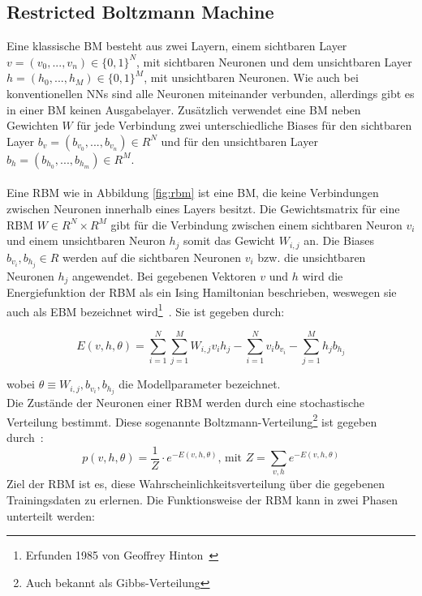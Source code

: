 \subsection{Restricted Boltzmann Machine}
\label{subsec:rbm}
Eine klassische BM besteht aus zwei Layern, einem sichtbaren Layer \\$v = (v_0, ... , v_n) \in \{0,1\}^N$, mit sichtbaren Neuronen und dem unsichtbaren Layer $h = (h_0, ... , h_M) \in \{0,1\}^M $, mit unsichtbaren Neuronen.
Wie auch bei konventionellen NNs sind alle Neuronen miteinander verbunden, allerdings gibt es in einer BM keinen Ausgabelayer. Zusätzlich verwendet eine BM neben Gewichten $W$ für jede Verbindung zwei unterschiedliche Biases für den sichtbaren Layer $b_{v} = (b_{v_0}, ... , b_{v_n}) \in R^N $ und für den unsichtbaren Layer $b_h = (b_{h_0}, ... , b_{h_m}) \in R^M $.\\\\ 
Eine RBM wie in Abbildung \ref{fig:rbm} ist eine BM, die keine Verbindungen zwischen Neuronen innerhalb eines Layers besitzt. Die Gewichtsmatrix für eine RBM $W \in R^N \times R^M$ gibt für die Verbindung zwischen einem sichtbaren Neuron $v_i$ und einem unsichtbaren Neuron $h_j$ somit das Gewicht $W_{i,j} $ an. Die Biases $b_{v_i}, b_{h_j} \in R$ werden auf die sichtbaren Neuronen $v_i$ bzw. die unsichtbaren Neuronen $h_j$ angewendet. Bei gegebenen Vektoren $v$ und $h$ wird die Energiefunktion der RBM als ein Ising Hamiltonian beschrieben, weswegen sie auch als EBM bezeichnet wird\footnote{Erfunden 1985 von Geoffrey Hinton~\cite{ackley1985learning}}~\cite{fischer2012introduction}. Sie ist gegeben durch:

\begin{equation} \label{eq:energiefunktion}
    E(v,h,\theta) = \sum^N_{i=1}\sum^M_{j=1} W_{i,j} v_i h_j - \sum^N_{i=1} v_i b_{v_i} - \sum^M_{j=1}h_j b_{h_j}
\end{equation}

\noindent wobei $\theta \equiv W_{i, j}, b_{v_i}, b_{h_j}$ die Modellparameter bezeichnet.\\
Die Zustände der Neuronen einer RBM werden durch eine stochastische Verteilung bestimmt. Diese sogenannte Boltzmann-Verteilung\footnote{Auch bekannt als Gibbs-Verteilung} ist gegeben durch~\cite{fischer2012introduction}:
\begin{equation}
    p(v,h,\theta) = \frac{1}{Z} \cdot e^{-E(v,h,\theta)} \text{, mit } Z = \sum_{v,h} e^{-E(v,h,\theta)}
\end{equation} Ziel der RBM ist es, diese Wahrscheinlichkeitsverteilung über die gegebenen Trainingsdaten zu erlernen. Die Funktionsweise der RBM kann in zwei Phasen unterteilt werden:

